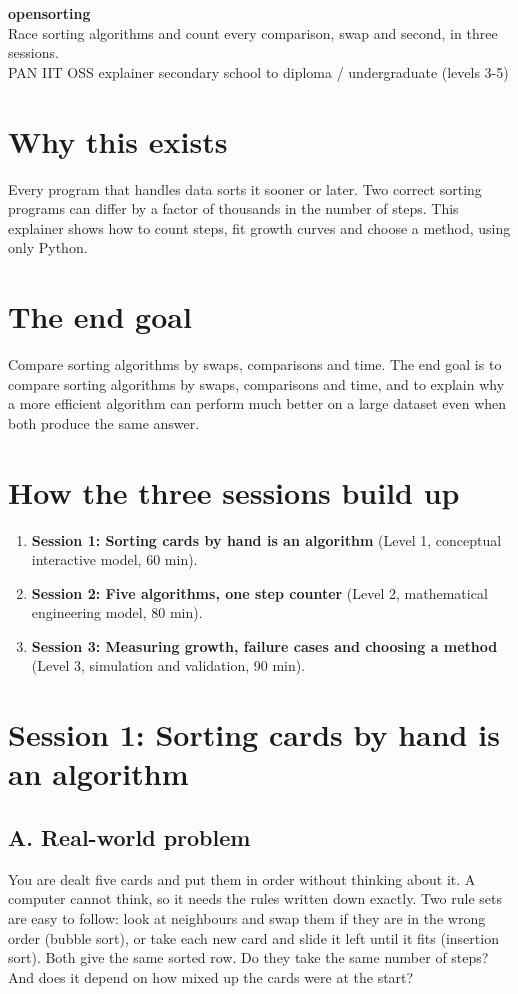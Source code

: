 \documentclass[11pt,a4paper]{article}
\begin{document}
\begin{center}{\LARGE\bfseries opensorting}\\[0.4em]{\large Race sorting algorithms and count every comparison, swap and second, in three sessions.}\\[0.2em]\small PAN IIT OSS explainer \textbullet{} secondary school to diploma / undergraduate (levels 3-5)\end{center}

\section*{Why this exists}
Every program that handles data sorts it sooner or later. Two correct sorting programs can differ by a factor of thousands in the number of steps. This explainer shows how to count steps, fit growth curves and choose a method, using only Python.

\section*{The end goal}
Compare sorting algorithms by swaps, comparisons and time. The end goal is to compare sorting algorithms by swaps, comparisons and time, and to explain why a more efficient algorithm can perform much better on a large dataset even when both produce the same answer.

\section*{How the three sessions build up}
\begin{enumerate}[nosep]
\item \textbf{Session 1: Sorting cards by hand is an algorithm} (Level 1, conceptual interactive model, 60 min).
\item \textbf{Session 2: Five algorithms, one step counter} (Level 2, mathematical engineering model, 80 min).
\item \textbf{Session 3: Measuring growth, failure cases and choosing a method} (Level 3, simulation and validation, 90 min).
\end{enumerate}

\section{Session 1: Sorting cards by hand is an algorithm}

\subsection*{A. Real-world problem}
You are dealt five cards and put them in order without thinking about it. A computer cannot think, so it needs the rules written down exactly. Two rule sets are easy to follow: look at neighbours and swap them if they are in the wrong order (bubble sort), or take each new card and slide it left until it fits (insertion sort). Both give the same sorted row. Do they take the same number of steps? And does it depend on how mixed up the cards were at the start?
\end{document}

